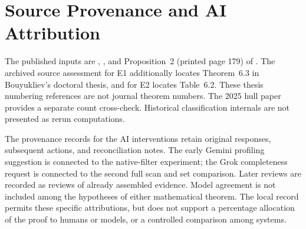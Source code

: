 \section{Source Provenance and AI Attribution}
The published inputs are \citet{bouyukliev2000}, \citet{bouyukliev2001}, and Proposition~2 (printed page 179) of \citet{bouyuklieva2020}. The archived source assessment for E1 additionally locates Theorem~6.3 in Bouyukliev's doctoral thesis, and for E2 locates Table~6.2. These thesis numbering references are not journal theorem numbers. The 2025 hull paper provides a separate count cross-check. Historical classification internals are not presented as rerun computations.

The provenance records for the AI interventions retain original responses, subsequent actions, and reconciliation notes. The early Gemini profiling suggestion is connected to the native-filter experiment; the Grok completeness request is connected to the second full scan and set comparison. Later reviews are recorded as reviews of already assembled evidence. Model agreement is not included among the hypotheses of either mathematical theorem. The local record permits these specific attributions, but does not support a percentage allocation of the proof to humans or models, or a controlled comparison among systems.
